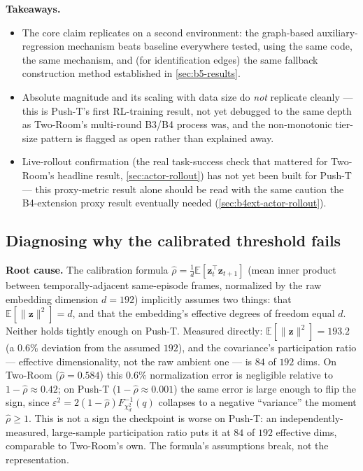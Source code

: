\documentclass[11pt]{article}
\newcommand{\zv}{\mathbf{z}}
\begin{document}
\textbf{Takeaways.}
\begin{itemize}[leftmargin=1.4em,itemsep=2pt]
\item The core claim replicates on a second environment: the graph-based auxiliary-regression
mechanism beats baseline everywhere tested, using the same code, the same mechanism, and (for
identification edges) the same fallback construction method established in \cref{sec:b5-results}.
\item Absolute magnitude and its scaling with data size do \emph{not} replicate cleanly --- this
is Push-T's first RL-training result, not yet debugged to the same depth as Two-Room's multi-round
B3/B4 process was, and the non-monotonic tier-size pattern is flagged as open rather than
explained away.
\item Live-rollout confirmation (the real task-success check that mattered for Two-Room's
headline result, \cref{sec:actor-rollout}) has not yet been built for Push-T --- this proxy-metric
result alone should be read with the same caution the B4-extension proxy result eventually
needed (\cref{sec:b4ext-actor-rollout}).
\end{itemize}

\subsection{Diagnosing why the calibrated threshold fails}
\label{sec:b5-calib-diagnosis}

\textbf{Root cause.} The calibration formula $\hat\rho = \tfrac{1}{d}\mathbb E[\zv_t^\top
\zv_{t+1}]$ (mean inner product between temporally-adjacent same-episode frames, normalized by
the raw embedding dimension $d{=}192$) implicitly assumes two things: that $\mathbb
E[\|\zv\|^2] = d$, and that the embedding's effective degrees of freedom equal $d$. Neither
holds tightly enough on Push-T. Measured directly: $\mathbb E[\|\zv\|^2] = 193.2$ (a $0.6\%$
deviation from the assumed $192$), and the covariance's participation ratio --- effective
dimensionality, not the raw ambient one --- is $84$ of $192$ dims. On Two-Room ($\hat\rho{=}0.584$)
this $0.6\%$ normalization error is negligible relative to $1-\hat\rho \approx 0.42$; on Push-T
($1-\hat\rho \approx 0.001$) the same error is large enough to flip the sign, since $\varepsilon^2
= 2(1-\hat\rho)F^{-1}_{\chi^2_d}(q)$ collapses to a negative ``variance'' the moment $\hat\rho \ge
1$. This is not a sign the checkpoint is worse on Push-T: an independently-measured, large-sample
participation ratio puts it at $84$ of $192$ effective dims, comparable to Two-Room's own. The
formula's assumptions break, not the representation.
\end{document}
